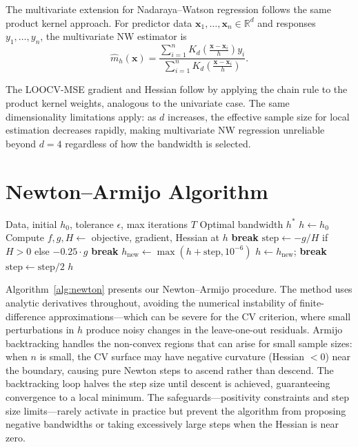 \documentclass[11pt]{article}
\theoremstyle{definition}
\theoremstyle{remark}
\newcommand{\R}{\mathbb{R}}
\begin{document}
The multivariate extension for Nadaraya--Watson regression follows the same product kernel approach.
For predictor data $\mathbf{x}_1, \ldots, \mathbf{x}_n \in \R^d$ and responses $y_1, \ldots, y_n$, the multivariate NW estimator is
\begin{equation}
    \hat{m}_h(\mathbf{x}) = \frac{\sum_{i=1}^{n} K_d\left( \frac{\mathbf{x} - \mathbf{x}_i}{h} \right) y_i}{\sum_{i=1}^{n} K_d\left( \frac{\mathbf{x} - \mathbf{x}_i}{h} \right)}.
\end{equation}

The LOOCV-MSE gradient and Hessian follow by applying the chain rule to the product kernel weights, analogous to the univariate case.
The same dimensionality limitations apply: as $d$ increases, the effective sample size for local estimation decreases rapidly, making multivariate NW regression unreliable beyond $d = 4$ regardless of how the bandwidth is selected.

\section{Newton--Armijo Algorithm}
\label{sec:algorithm}

\begin{algorithm}[t]
\caption{Newton--Armijo Bandwidth Selection}
\label{alg:newton}
\begin{algorithmic}[1]
\Require Data, initial $h_0$, tolerance $\epsilon$, max iterations $T$
\Ensure Optimal bandwidth $h^*$
\State $h \gets h_0$
    \State Compute $f, g, H \gets$ objective, gradient, Hessian at $h$
     \textbf{break} \EndIf
    \State $\text{step} \gets -g/H$ if $H > 0$ else $-0.25 \cdot g$
     \textbf{break} \EndIf
     
        \State $h_{\text{new}} \gets \max(h + \text{step}, 10^{-6})$
            \State $h \gets h_{\text{new}}$; \textbf{break}
        \EndIf
        \State $\text{step} \gets \text{step} / 2$
    \EndFor
\EndFor
\State \Return $h$
\end{algorithmic}
\end{algorithm}

Algorithm~\ref{alg:newton} presents our Newton--Armijo procedure.
The method uses analytic derivatives throughout, avoiding the numerical instability of finite-difference approximations---which can be severe for the CV criterion, where small perturbations in $h$ produce noisy changes in the leave-one-out residuals.
Armijo backtracking handles the non-convex regions that can arise for small sample sizes: when $n$ is small, the CV surface may have negative curvature (Hessian $< 0$) near the boundary, causing pure Newton steps to ascend rather than descend.
The backtracking loop halves the step size until descent is achieved, guaranteeing convergence to a local minimum.
The safeguards---positivity constraints and step size limits---rarely activate in practice but prevent the algorithm from proposing negative bandwidths or taking excessively large steps when the Hessian is near zero.
\end{document}
